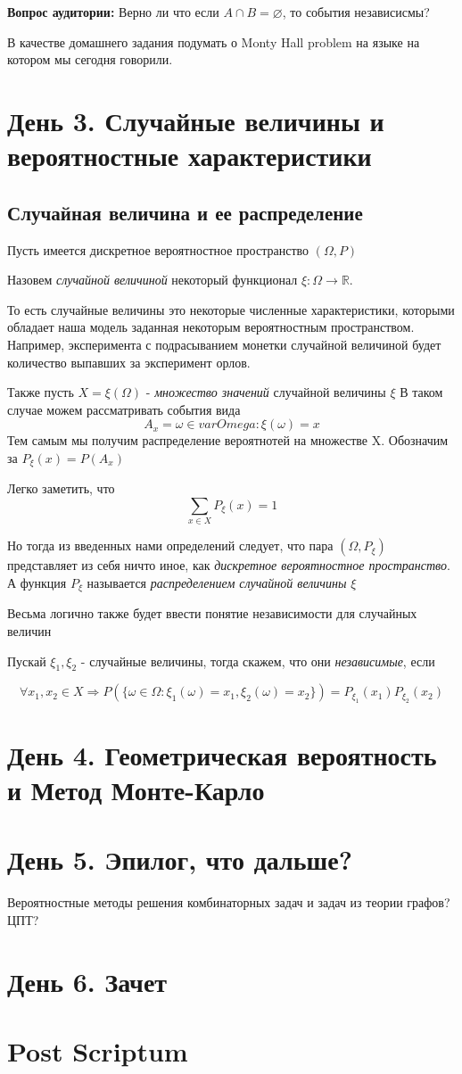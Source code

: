 \documentclass{article}
\theoremstyle{definition}
\newcommand{\question}{\textbf{Вопрос аудитории: }}
\theoremstyle{remark}
\begin{document}
\question{Верно ли что если $A \cap B = \varnothing$, то события независисмы? }

В качестве домашнего задания подумать о Monty Hall problem на языке на котором мы сегодня говорили.

\section{День 3. Случайные величины и вероятностные характеристики}

\subsection{Случайная величина и ее распределение}

Пусть имеется дискретное вероятностное пространство $(\varOmega, P)$

Назовем \textit{случайной величиной} некоторый функционал $\xi: \varOmega \to \mathbb{R}$.

То есть случайные величины это некоторые численные характеристики, которыми обладает наша модель заданная
некоторым вероятностным пространством. Например, эксперимента с подрасыванием монетки случайной величиной будет
количество выпавших за эксперимент орлов.


Также пусть $X = \xi(\varOmega)$ - \textit{множество значений} случайной величины $\xi$ 
В таком случае можем рассматривать события вида 
$$
A_x = {\omega \in varOmega: \xi(\omega) = x}
$$
Тем самым мы получим распределение вероятнотей на множестве X.
Обозначим за $P_\xi(x) = P(A_x)$


Легко заметить, что 
$$
\sum_{x \in X} P_\xi(x)  = 1
$$

Но тогда из введенных нами определений следует, что пара $(\varOmega, P_\xi)$ 
представляет из себя ничто иное, как \textit{дискретное вероятностное пространство}.
А функция $P_\xi$ называется \textit{распределением случайной величины} $\xi$

Весьма логично также будет ввести понятие независимости для случайных величин 

Пускай $\xi_1, \xi_2$ - случайные величины, тогда скажем, что они \textit{независимые}, 
если

$$
\forall x_1, x_2 \in X \Rightarrow P(\{\omega \in \varOmega: \xi_1(\omega) = x_1, \xi_2(\omega) = x_2\}) = P_{\xi_1}(x_1)P_{\xi_2}(x_2)
$$



\section{День 4. Геометрическая вероятность и Метод Монте-Карло}

\section{День 5. Эпилог, что дальше?}

Вероятностные методы решения комбинаторных задач и задач из теории графов? ЦПТ? 

\section{День 6. Зачет}

\section*{Post Scriptum}
\end{document}
